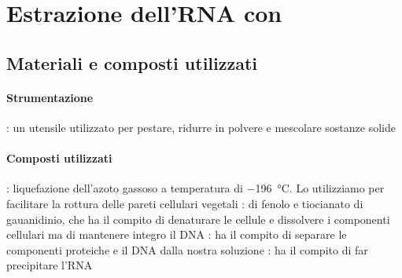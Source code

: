 \section{Estrazione dell'RNA con \trizol}
\subsection{Materiali e composti utilizzati}
\paragraph{Strumentazione}
\begin{itemize}[person]
	: un utensile utilizzato per pestare, ridurre in polvere e mescolare sostanze solide
\end{itemize}

\paragraph{Composti utilizzati}

\begingroup
{}
\begin{itemize}[person]
	: liquefazione dell'azoto gassoso a temperatura di \qty{-196}{\celsius}. Lo utilizziamo per facilitare la rottura delle pareti cellulari vegetali
	\itemb[\trizol]: \slz di fenolo e tiocianato di gauanidinio, che ha il compito di denaturare le cellule e dissolvere i componenti cellulari ma di mantenere integro il DNA 
	\itemb[Cloroformio]: ha il compito di separare le componenti proteiche e il DNA dalla nostra soluzione
	\itemb[Isopropanolo]: ha il compito di far precipitare l'RNA
\end{itemize}
\endgroup

